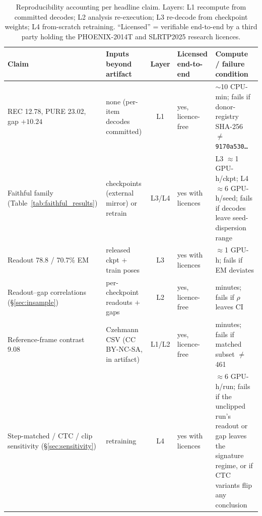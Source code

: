 \documentclass[pdflatex,sn-chicago]{sn-jnl}
\begin{document}
\begin{table}[h]
\centering
\scriptsize\setlength{\tabcolsep}{3pt}
\caption{Reproducibility accounting per headline claim. Layers: L1 recompute from committed decodes; L2 analysis re-execution; L3 re-decode from checkpoint weights; L4 from-scratch retraining. ``Licensed'' = verifiable end-to-end by a third party holding the PHOENIX-2014T and SLRTP2025 research licences.}
\label{tab:repro_tiers}
\begin{tabular}{p{3.3cm}p{2.5cm}cp{1.9cm}p{2.6cm}}
\toprule
Claim & Inputs beyond artifact & Layer & Licensed end-to-end & Compute / failure condition \\
\midrule
REC 12.78, PURE 23.02, gap $+10.24$ & none (per-item decodes committed) & L1 & yes, licence-free & $\sim$10 CPU-min; fails if donor-registry SHA-256 $\neq$ \texttt{9170a530\ldots} \\
Faithful family (Table~\ref{tab:faithful_results}) & checkpoints (external mirror) or retrain & L3/L4 & yes with licences & L3 $\approx$1 GPU-h/ckpt; L4 $\approx$6 GPU-h/seed; fails if decodes leave seed-dispersion range \\
Readout 78.8 / 70.7\% EM & released ckpt $+$ train poses & L3 & yes with licences & $\approx$1 GPU-h; fails if EM deviates \\
Readout--gap correlations (\S\ref{sec:insample}) & per-checkpoint readouts $+$ gaps & L2 & yes, licence-free & minutes; fails if $\rho$ leaves CI \\
Reference-frame contrast 9.08 & Czehmann CSV (CC BY-NC-SA, in artifact) & L1/L2 & yes, licence-free & minutes; fails if matched subset $\neq$ 461 \\
Step-matched / CTC / clip sensitivity (\S\ref{sec:sensitivity}) & retraining & L4 & yes with licences & $\approx$6 GPU-h/run; fails if the unclipped run's readout or gap leaves the signature regime, or if CTC variants flip any conclusion \\
\bottomrule
\end{tabular}
\end{table}
\end{document}
